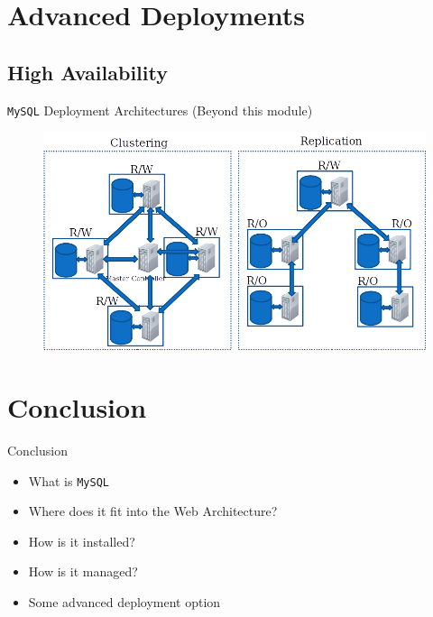 \documentclass[xcolor=table]{beamer}
\begin{document}
\section{Advanced Deployments}
\subsection{High Availability}
\begin{frame}{\texttt{MySQL} Deployment Architectures \small{(Beyond this module)}}
  \begin{figure}
    \begin{center}
      \includegraphics[width=1\linewidth]{Advanced.png}
    \end{center}
  \end{figure}
\end{frame}

\section*{Conclusion}
\begin{frame}{Conclusion}
  \begin{itemize}
    \item What is \texttt{MySQL}
    \item Where does it fit into the Web Architecture?
    \item How is it installed?
    \item How is it managed?
    \item Some advanced deployment option 
  \end{itemize}
\end{frame}
\end{document}
